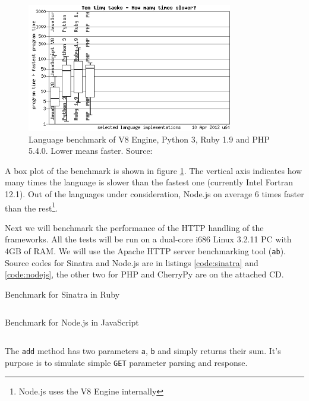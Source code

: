 \documentclass[12pt,oneside]{fithesis}
\begin{document}
		\begin{figure}[htb]
	  \centering
	    \includegraphics[width=0.8\textwidth]{bench2.png}
		  \caption{Language benchmark of V8 Engine, Python 3, Ruby 1.9 and PHP 5.4.0. Lower means faster. Source: \cite{website:bench}}
		  \label{fig:bench1}
		\end{figure}
		
		A box plot of the benchmark is shown in figure \ref{fig:bench1}. The vertical axis indicates how many times the language is slower than the fastest one (currently Intel Fortran 12.1). Out of the languages under consideration, Node.js on average 6 times faster than the rest\footnote{Node.js uses the V8 Engine internally}. 
		
		Next we will benchmark the performance of the HTTP handling of the frameworks. All the tests will be run on a dual-core i686 Linux 3.2.11 PC with 4GB of RAM. We will use the Apache HTTP server benchmarking tool (\texttt{ab}). Source codes for Sinatra and Node.js are in listings \ref{code:sinatra} and \ref{code:nodejs}, the other two for PHP and CherryPy are on the attached CD.

		\begin{program}
		\caption{Benchmark for Sinatra in Ruby}
		\label{code:sinatra}
		\inputminted[fontsize=\footnotesize]{ruby}{../bench/sinatra/app.rb} 
		\end{program}
		
		\begin{program}
		\caption{Benchmark for Node.js in JavaScript}
		\label{code:nodejs}
		\inputminted[fontsize=\footnotesize]{javascript}{../bench/nodejs/app.js}
		\end{program}

		The \texttt{add} method has two parameters \texttt{a}, \texttt{b} and simply returns their sum. It's purpose is to simulate simple \texttt{GET} parameter parsing and response.
		
\end{document}
